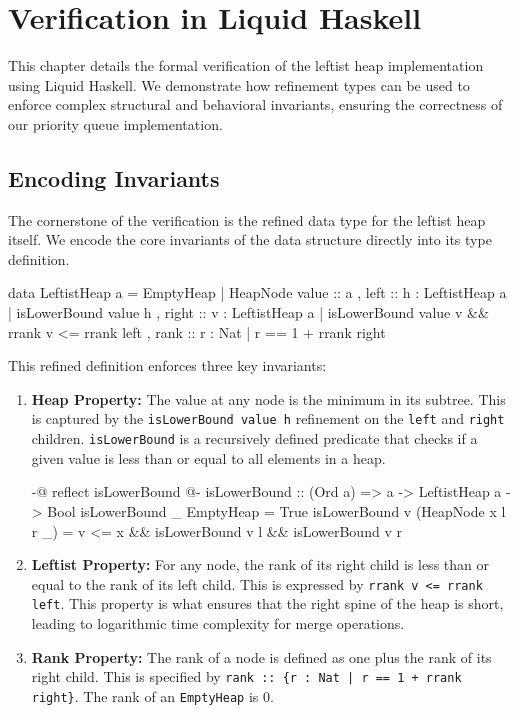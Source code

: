 \chapter{Verification in Liquid Haskell}
\label{ch:verification}
This chapter details the formal verification of the leftist heap implementation using Liquid Haskell. We demonstrate how refinement types can be used to enforce complex structural and behavioral invariants, ensuring the correctness of our priority queue implementation.

\section{Encoding Invariants}
The cornerstone of the verification is the refined data type for the leftist heap itself. We encode the core invariants of the data structure directly into its type definition.

\begin{code}
  data LeftistHeap a = EmptyHeap
        | HeapNode { value :: a
                   , left  :: {h : LeftistHeap a | isLowerBound value h}
                   , right :: {v : LeftistHeap a  | isLowerBound value v
                              && rrank v <= rrank left }
                   , rank :: {r : Nat | r == 1 + rrank right}
          }
\end{code}

This refined definition enforces three key invariants:
\begin{enumerate}
    \item \textbf{Heap Property:} The value at any node is the minimum in its subtree. This is captured by the \texttt{isLowerBound value h} refinement on the \texttt{left} and \texttt{right} children. \texttt{isLowerBound} is a recursively defined predicate that checks if a given value is less than or equal to all elements in a heap.
    \begin{code}
  {-@ reflect isLowerBound @-} 
  isLowerBound :: (Ord a) => a -> LeftistHeap a -> Bool
  isLowerBound _ EmptyHeap = True
  isLowerBound v (HeapNode x l r _) = 
      v <= x && isLowerBound v l && isLowerBound v r
    \end{code}
    
    \item \textbf{Leftist Property:} For any node, the rank of its right child is less than or equal to the rank of its left child. This is expressed by \texttt{rrank v <= rrank left}. This property is what ensures that the right spine of the heap is short, leading to logarithmic time complexity for merge operations.
    
    \item \textbf{Rank Property:} The rank of a node is defined as one plus the rank of its right child. This is specified by \texttt{rank :: \{r : Nat | r == 1 + rrank right\}}. The rank of an \texttt{EmptyHeap} is 0.
\end{enumerate}


